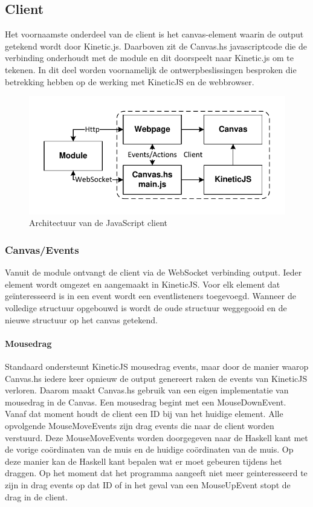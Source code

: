
\subsection{Client}
Het voornaamste onderdeel van de client is het canvas-element waarin de output getekend wordt door Kinetic.js. Daarboven zit de Canvas.hs javascriptcode die de verbinding onderhoudt met de module en dit doorspeelt naar Kinetic.js om te tekenen. In dit deel worden voornamelijk de ontwerpbeslissingen besproken die betrekking hebben op de werking met KineticJS en de webbrowser.

\begin{figure}
\begin{center}
\includegraphics[keepaspectratio,width=\textwidth]{./images/client_architecture.pdf}
\caption{Architectuur van de JavaScript client}
\label{fig:architecture_client}
\end{center}
\end{figure}

\subsubsection{Canvas/Events}
Vanuit de module ontvangt de client via de WebSocket verbinding output. Ieder element wordt omgezet en aangemaakt in KineticJS. Voor elk element dat ge\"interesseerd is in een event wordt een eventlisteners toegevoegd. Wanneer de volledige structuur opgebouwd is wordt de oude structuur weggegooid en de nieuwe structuur op het canvas getekend.

\paragraph{Mousedrag}
Standaard ondersteunt KineticJS mousedrag events, maar door de manier waarop Canvas.hs iedere keer opnieuw de output genereert raken de events van KineticJS verloren. Daarom maakt Canvas.hs gebruik van een eigen implementatie van mousedrag in de Canvas. Een mousedrag begint met een MouseDownEvent. Vanaf dat moment houdt de client een ID bij van het huidige element. Alle opvolgende MouseMoveEvents zijn drag events die naar de client worden verstuurd. Deze MouseMoveEvents worden doorgegeven naar de Haskell kant met de vorige coördinaten van de muis en de huidige coördinaten van de muis.
Op deze manier kan de Haskell kant bepalen wat er moet gebeuren tijdens het draggen. Op het moment dat het programma aangeeft niet meer geinteresseerd te zijn in drag events op dat ID of in het geval van een MouseUpEvent stopt de drag in de client.

